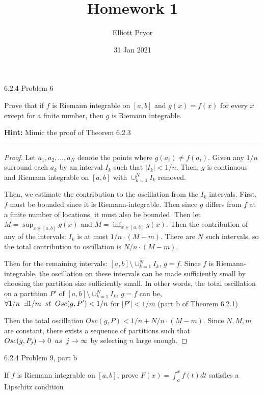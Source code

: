\documentclass[11pt]{article}
\title{Homework 1}
\author{Elliott Pryor}
\date{31 Jan 2021}
\begin{document}
\maketitle

 6.2.4 Problem 6

Prove that if $f$ is Riemann integrable on $[a, b]$ and $g(x) = f(x)$ for
every $x$ except for a finite number, then $g$ is Riemann integrable.

\textbf{Hint:} Mimic the proof of Theorem 6.2.3

\hrule

\begin{proof}
    
    Let $a_1, a_2, ..., a_N$ denote the points where $g(a_i) \neq f(a_i)$.
    Given any $1/n$ surround each $a_k$ by an interval $I_k$ such that $|I_k| < 1/n$. Then,
    $g$ is continuous and Riemann integrable on $[a,b]$ with $\cup_{k = 1} ^N I_k$ removed.

    Then, we estimate the contribution to the oscillation from the $I_k$ intervals. First, $f$ must be bounded since
    it is Riemann-integrable. Then since $g$ differs from $f$ at a finite number of locations, it must also be bounded. 
    Then let $M = \sup _{x \in [a,b]} g(x)$ and $M = \inf _{x \in [a,b]} g(x)$. Then the contribution of any of the intervals:
    $I_k$ is at most $1/n \cdot (M-m)$. There are $N$ such intervals, so the total contribution to oscillation is $N/n \cdot (M - m)$.

    Then for the remaining intervals: $[a,b] \setminus \cup_{k = 1} ^N I_k$, $g = f$. Since $f$ is Riemann-integrable,
    the oscillation on these intervals can be made sufficiently small by choosing the partition size sufficiently small. 
    In other words, the total oscillation on a partition $P'$ of $[a,b] \setminus \cup_{k = 1} ^N I_k$, $g = f$ can be,
    $\forall 1/n \sp \exists 1/m \sp st \sp Osc(g, P') < 1/n$ for $|P'| < 1/m$ (part b of Theorem 6.2.1)

    Then the total oscillation $Osc(g, P) < 1/n + N/n \cdot (M - m)$. Since $N, M, m$ are constant, there exists a sequence of 
    partitions such that $Osc(g, P_j) \to 0 \sp as \sp j \to \infty$ by selecting $n$ large enough.


\end{proof}



 6.2.4 Problem 9, part b

If $f$ is Riemann integrable on $[a, b]$, prove $F(x) = \int_a ^x f(t) dt$ satisfies a Lipschitz condition
\end{document}
